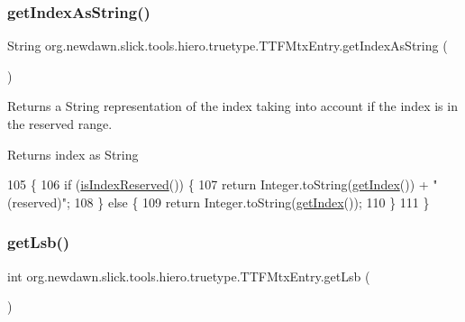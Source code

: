 \subsubsection{\texorpdfstring{get\+Index\+As\+String()}{getIndexAsString()}}
{\footnotesize\ttfamily String org.\+newdawn.\+slick.\+tools.\+hiero.\+truetype.\+T\+T\+F\+Mtx\+Entry.\+get\+Index\+As\+String (\begin{DoxyParamCaption}{ }\end{DoxyParamCaption})\hspace{0.3cm}{\ttfamily [inline]}}

Returns a String representation of the index taking into account if the index is in the reserved range. \begin{DoxyReturn}{Returns}
index as String 
\end{DoxyReturn}

\begin{DoxyCode}
105                                      \{
106         \textcolor{keywordflow}{if} (\mbox{\hyperlink{classorg_1_1newdawn_1_1slick_1_1tools_1_1hiero_1_1truetype_1_1_t_t_f_mtx_entry_a41f4ce85bd52d1e53e6af7ecc93012cb}{isIndexReserved}}()) \{
107             \textcolor{keywordflow}{return} Integer.toString(\mbox{\hyperlink{classorg_1_1newdawn_1_1slick_1_1tools_1_1hiero_1_1truetype_1_1_t_t_f_mtx_entry_a81326d1275e3ec5e754e4d8f51a59284}{getIndex}}()) + \textcolor{stringliteral}{" (reserved)"};
108         \} \textcolor{keywordflow}{else} \{
109             \textcolor{keywordflow}{return} Integer.toString(\mbox{\hyperlink{classorg_1_1newdawn_1_1slick_1_1tools_1_1hiero_1_1truetype_1_1_t_t_f_mtx_entry_a81326d1275e3ec5e754e4d8f51a59284}{getIndex}}());
110         \}
111     \}
\end{DoxyCode}
\mbox{\label{classorg_1_1newdawn_1_1slick_1_1tools_1_1hiero_1_1truetype_1_1_t_t_f_mtx_entry_acb7e86e0b72a60eeaa7090b26bd157e1}} 
\subsubsection{\texorpdfstring{get\+Lsb()}{getLsb()}}
{\footnotesize\ttfamily int org.\+newdawn.\+slick.\+tools.\+hiero.\+truetype.\+T\+T\+F\+Mtx\+Entry.\+get\+Lsb (\begin{DoxyParamCaption}{ }\end{DoxyParamCaption})\hspace{0.3cm}{\ttfamily [inline]}}

